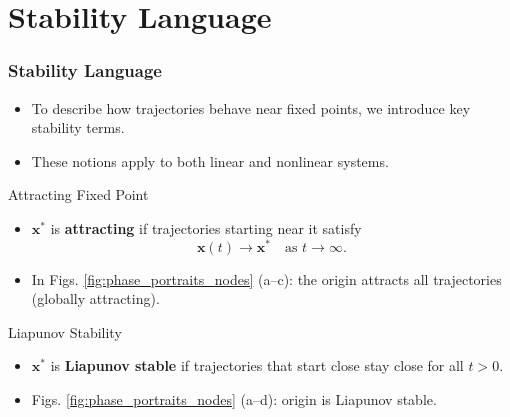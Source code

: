 \documentclass{beamer}
\begin{document}
\section{Stability Language}

\begin{frame}
  \frametitle{Stability Language}
  \tiny
  \begin{itemize}
    \item To describe how trajectories behave near fixed points, we introduce key stability terms.
    \item These notions apply to both linear and nonlinear systems.
  \end{itemize}

  \vspace{0.4em}
  \begin{block}{Attracting Fixed Point}
    \begin{itemize}
      \item \( \mathbf{x}^* \) is \textbf{attracting} if trajectories starting near it satisfy
        \[
          \mathbf{x}(t) \to \mathbf{x}^* \quad \text{as } t \to \infty.
        \]
      \item In Figs. \ref{fig:phase_portraits_nodes} (a–c): the origin attracts all trajectories (globally attracting).
    \end{itemize}
  \end{block}

  \begin{block}{Liapunov Stability}
    \begin{itemize}
      \item \( \mathbf{x}^* \) is \textbf{Liapunov stable} if trajectories that start close stay close for all \(t>0\).
      \item Figs.  \ref{fig:phase_portraits_nodes} (a–d): origin is Liapunov stable.
    \end{itemize}
  \end{block}
\end{frame}

\end{document}
